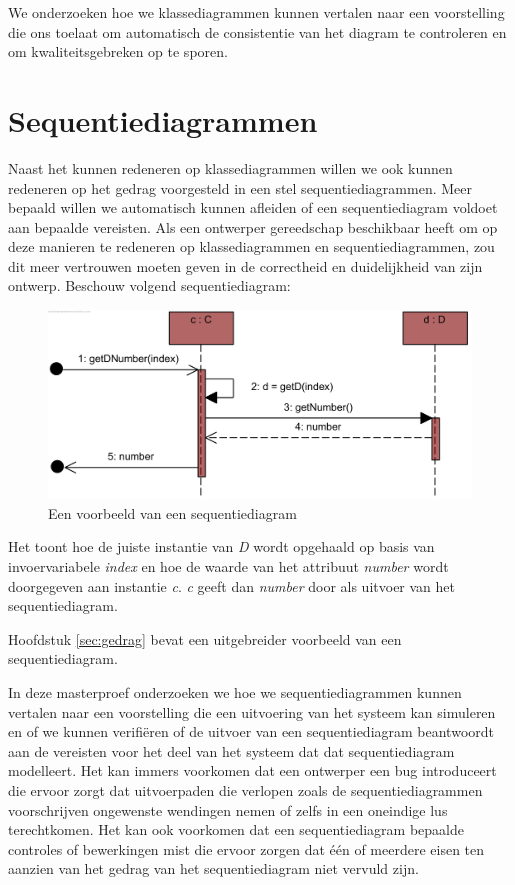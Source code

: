 We onderzoeken hoe we klassediagrammen kunnen vertalen naar een voorstelling die ons toelaat om automatisch de consistentie van het diagram te controleren en om kwaliteitsgebreken op te sporen.

\section{Sequentiediagrammen}

Naast het kunnen redeneren op klassediagrammen willen we ook kunnen redeneren op het gedrag voorgesteld in een stel sequentiediagrammen. Meer bepaald willen we automatisch kunnen afleiden of een sequentiediagram voldoet aan bepaalde vereisten. Als een ontwerper gereedschap beschikbaar heeft om op deze manieren te redeneren op klassediagrammen en sequentiediagrammen, zou dit meer vertrouwen moeten geven in de correctheid en duidelijkheid van zijn ontwerp. Beschouw volgend sequentiediagram:

\begin{figure}[H]
	\label{fig:sd}
	\centering
	\includegraphics{intro/sd.png}
	\caption{Een voorbeeld van een sequentiediagram}
\end{figure}

Het toont hoe de juiste instantie van \textit{D} wordt opgehaald op basis van invoervariabele \textit{index} en hoe de waarde van het attribuut \textit{number} wordt doorgegeven aan instantie \textit{c}. \textit{c} geeft dan \textit{number} door als uitvoer van het sequentiediagram.

Hoofdstuk \ref{sec:gedrag} bevat een uitgebreider voorbeeld van een sequentiediagram.

In deze masterproef onderzoeken we hoe we sequentiediagrammen kunnen vertalen naar een voorstelling die een uitvoering van het systeem kan simuleren en of we kunnen verifi\"eren of de uitvoer van een sequentiediagram beantwoordt aan de vereisten voor het deel van het systeem dat dat sequentiediagram modelleert. Het kan immers voorkomen dat een ontwerper een bug introduceert die ervoor zorgt dat uitvoerpaden die verlopen zoals de sequentiediagrammen voorschrijven ongewenste wendingen nemen of zelfs in een oneindige lus terechtkomen. Het kan ook voorkomen dat een sequentiediagram bepaalde controles of bewerkingen mist die ervoor zorgen dat \'e\'en of meerdere eisen ten aanzien van het gedrag van het sequentiediagram niet vervuld zijn.

